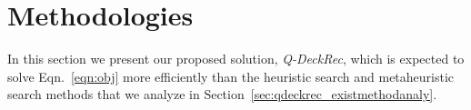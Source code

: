 


\section{Methodologies}\label{sec:method}
In this section we present our proposed solution, \textit{Q-DeckRec}, which is expected to solve Eqn.~\ref{eqn:obj} more efficiently than the heuristic search and metaheuristic search methods that we analyze in Section~\ref{sec:qdeckrec_existmethodanaly}. 







